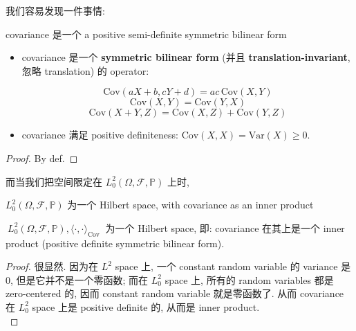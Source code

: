 \documentclass{qlnotes-export}
\begin{document}
我们容易发现一件事情:

\begin{theorem}{covariance 是一个 a positive semi-definite symmetric bilinear form}\label{thm-02-random-variables-covariance-a-positive-semi-definite-symmetric-bilinear-f}

\begin{itemize}
\item
  covariance 是一个 \textbf{symmetric bilinear form} (并且 \textbf{translation-invariant}, 忽略 translation) 的 operator:

  \[\text{Cov}(aX + b,cY + d) = ac\,\text{Cov}(X,Y)\]\[\text{Cov}(X,Y) = \text{Cov}(Y,X)\]\[\text{Cov}(X + Y,Z) = \text{Cov}(X,Z) + \text{Cov}(Y,Z)\]
\item
  covariance 满足 positive definiteness: \(\text{Cov}(X,X) = \text{Var}(X) \geq 0\).
\end{itemize}

\end{theorem}

\begin{proof}

By def.

\end{proof}

而当我们把空间限定在 \(L_{0}^{2}(\Omega,\mathcal{F},{\mathbb{P}})\) 上时,

\begin{theorem}{\(L_{0}^{2}(\Omega,\mathcal{F},{\mathbb{P}})\) 为一个 Hilbert space,
with covariance as an inner product}\label{thm-02-random-variables-l-2-0-omega-mathcal-f-mathbb-p-hilbert-space-with-covar}

\(\ L_{0}^{2}(\Omega,\mathcal{F},{\mathbb{P}}),\langle \cdot , \cdot \rangle_{\text{Cov}}\ \) 为一个 Hilbert space, 即: covariance 在其上是一个 inner product (positive definite symmetric bilinear form).

\end{theorem}

\begin{proof}

很显然. 因为在 \(L^{2}\) space 上, 一个 constant random variable 的 variance 是 0, 但是它并不是一个零函数; 而在 \(L_{0}^{2}\) space 上, 所有的 random variables 都是 zero-centered 的, 因而 constant random variable 就是零函数了. 从而 covariance 在 \(L_{0}^{2}\) space 上是 positive definite 的, 从而是 inner product.\\

\end{proof}
\end{document}
